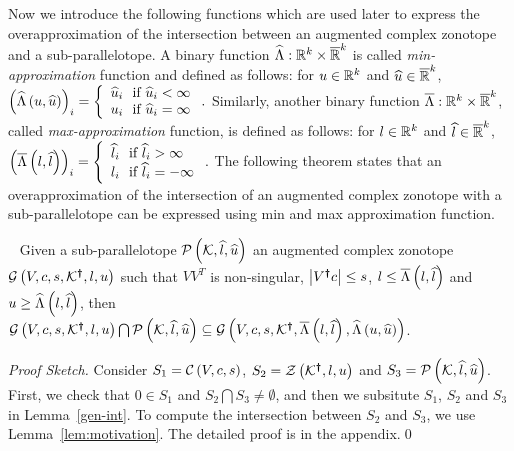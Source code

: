 Now we introduce the following functions which are used later to
express the overapproximation of the intersection between an augmented
complex zonotope and a sub-parallelotope.
%
A binary function
$\widehat{\Lambda}:\mathbb{R}^k\times\mathbb{\overline{R}}^k$ is
called \emph{min-approximation} function and defined as follows: for
$u\in\mathbb{R}^k$ and $\widehat{u}\in\mathbb{\overline{R}}^k$,
$\left(\widehat{\Lambda}\left(u,\widehat{u}\right)\right)_i = \left\{
\begin{array}{l}
\widehat{u}_i~~\text{if}~\widehat{u}_i<\infty\\
u_i~~\text{if}~\widehat{u}_i=\infty
\end{array}
\right..$
Similarly, another binary function       
$\overline{\Lambda}:\mathbb{R}^k\times\mathbb{\overline{R}}^k$,
called \emph{max-approximation} function, is defined as follows: for
$l\in\mathbb{R}^k$ and $\widehat{l}\in\mathbb{\overline{R}}^k$,
$\left(\overline{\Lambda}\left(l,\widehat{l}\right)\right)_i = \left\{
\begin{array}{l}
\widehat{l}_i~~\text{if}~\widehat{l}_i>\infty\\
l_i~~\text{if}~\widehat{l}_i=-\infty
\end{array}
\right..$
%
The following theorem states that an overapproximation of the intersection
of an augmented complex zonotope with a sub-parallelotope can be
expressed using min and max approximation function.
\begin{theorem}~\label{thm:acz-int}
Given a sub-parallelotope $\mathcal{P}\left(\mathcal{K},\widehat{l},\widehat{u}\right)$ an
augmented complex zonotope $\mathcal{G}\left(V,c,s,\mathcal{K}^{\bm{\dagger}},l,u\right)$
such that $VV^T$ is non-singular, $\left|V^{\bm{\dagger}}c\right|\leq s$, $l\leq
\overline{\Lambda}\left(l,\widehat{l}\right)$ and $u\geq \widehat{\Lambda}\left(l,\widehat{l}\right)$, then
$\mathcal{G}\left(V,c,s,\mathcal{K}^{\bm{\dagger}},l,u\right)\bigcap\mathcal{P}\left(\mathcal{K},\widehat{l},\widehat{u}\right)\subseteq
\mathcal{G}\left(V,c,s,\mathcal{K}^{\bm{\dagger}},\overline{\Lambda}\left(l,\widehat{l}\right),\widehat{\Lambda}\left(u,\widehat{u}\right)\right)$.
\end{theorem}
\emph{Proof Sketch.}  Consider $S_1 = \mathcal{C}\left(V,c,s\right)$, $S_2 =
\mathcal{Z}\left(\mathcal{K}^{\bm{\dagger}},l,u\right)$ and $S_3 =
\mathcal{P}\left(\mathcal{K},\widehat{l},\widehat{u}\right)$.  First, we check that $0\in S_1$
and $S_2\bigcap S_3\neq \emptyset$, and then we subsitute $S_1$, $S_2$
and $S_3$ in Lemma~\ref{gen-int}.  To compute the intersection
between $S_2$ and $S_3$, we use Lemma~\ref{lem:motivation}.  The
detailed proof is in the appendix.\qed


